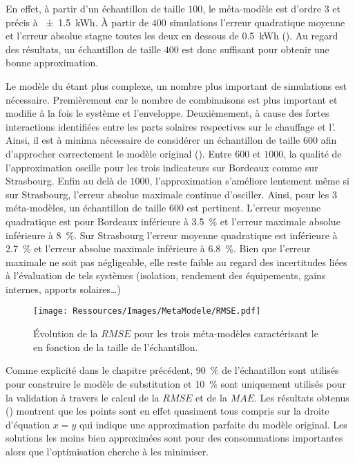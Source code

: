 En effet, à partir d’un échantillon de taille $100$, le méta-modèle est d’ordre $3$ et précis à
\SI{+- 1.5}{kWh}. À partir de $400$ simulations l’erreur quadratique moyenne et l’erreur
absolue stagne toutes les deux en dessous de \SI{0.5}{kWh} ().
Au regard des résultats, un échantillon de taille $400$ est donc suffisant pour obtenir
une bonne approximation.

Le modèle du  étant plus complexe, un nombre plus important de simulations est
nécessaire. Premièrement car le nombre de combinaisons est plus important et modifie à la
fois le système et l’enveloppe. Deuxièmement, à cause des fortes interactions identifiées
entre les parts solaires respectives sur le chauffage et l’. Ainsi, il est à
minima nécessaire de considérer un échantillon de taille $600$ afin d’approcher
correctement le modèle original (). Entre $600$ et $1000$, la qualité
de l’approximation oscille pour les trois indicateurs sur Bordeaux comme sur Strasbourg.
Enfin au delà de $1000$, l’approximation s’améliore lentement même si sur Strasbourg,
l’erreur absolue maximale continue d’osciller.
Ainsi, pour les $3$ méta-modèles, un échantillon de taille $600$ est pertinent.
L’erreur moyenne quadratique est pour Bordeaux inférieure à \SI{3.5}{\percent} et
l’erreur maximale absolue inférieure à \SI{8}{\percent}.
Sur Strasbourg l’erreur moyenne quadratique est inférieure à \SI{2.7}{\percent} et
l’erreur absolue maximale inférieure à \SI{6.8}{\percent}.
Bien que l’erreur maximale ne soit pas négligeable, elle reste faible au regard
des incertitudes liées à l’évaluation de tels systèmes (isolation, rendement des équipements,
gains internes, apports solaires\dots)

\begin{figure}
    \centering
    \texttt{[image: Ressources/Images/MetaModele/RMSE.pdf]}
    \caption[Évolution de la $RMSE$ sur le  en fonction de l’échantillon]
            {Évolution de la $RMSE$ pour les trois méta-modèles caractérisant le 
             en fonction de la taille de l’échantillon.}
    \label{fig:rmse_mae}
\end{figure}

Comme explicité dans le chapitre précédent, \SI{90}{\percent} de l’échantillon sont utilisés
pour construire le modèle de substitution et \SI{10}{\percent} sont uniquement
utilisés pour la validation à travers le calcul de la $RMSE$ et de la $MAE$.
Les résultats obtenus () montrent que les points sont en
effet quasiment tous compris sur la droite d’équation $x = y$ qui indique une approximation
parfaite du modèle original. Les solutions les moins bien approximées sont pour des
consommations importantes alors que l’optimisation cherche à les minimiser.

